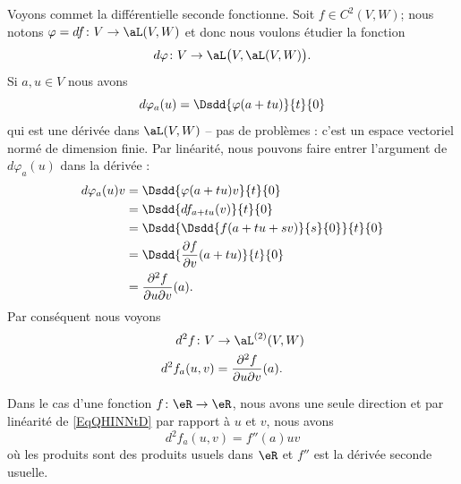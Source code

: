 \begin{example} \label{ExZHZYcNH}
    Voyons commet la différentielle seconde fonctionne. Soit \( f\in C^2(V,W)\); nous notons \( \varphi=df\colon V\to \aL(V,W)\) et donc nous voulons étudier la fonction
    \begin{equation}
        d\varphi\colon V\to \aL\big( V,\aL(V,W) \big).
    \end{equation}
    Si \( a,u\in V\)  nous avons
    \begin{equation}
        d\varphi_a(u)=\Dsdd{ \varphi(a+tu) }{t}{0}
    \end{equation}
    qui est une dérivée dans \( \aL(V,W)\) -- pas de problèmes : c'est un espace vectoriel normé de dimension finie. Par linéarité, nous pouvons faire entrer l'argument de \( d\varphi_a(u)\) dans la dérivée :
    \begin{subequations}
        \begin{align}
            d\varphi_a(u)v&=\Dsdd{ \varphi(a+tu)v }{t}{0}\\
            &=\Dsdd{ df_{a+tu}(v) }{t}{0}\\
            &=\Dsdd{  \Dsdd{ f(a+tu+sv) }{s}{0}  }{t}{0}\\
            &=\Dsdd{ \frac{ \partial f }{ \partial v }(a+tu) }{t}{0}\\
            &=\frac{ \partial^2f  }{ \partial u\partial v }(a).
        \end{align}
    \end{subequations}
    Par conséquent nous voyons
    \begin{equation}\label{EqQHINNtD}
        \begin{aligned}
            d^2f\colon V&\to \aL^{(2)}(V,W) \\
            d^2f_a(u,v)&=\frac{ \partial^2f  }{ \partial u\partial v }(a). 
        \end{aligned}
    \end{equation}
    
    Dans le cas d'une fonction \( f\colon \eR\to \eR\), nous avons une seule direction et par linéarité de \eqref{EqQHINNtD} par rapport à \( u\) et \( v\), nous avons
    \begin{equation}
        d^2f_a(u,v)=f''(a)uv
    \end{equation}
    où les produits sont des produits usuels dans \( \eR\) et \( f''\) est la dérivée seconde usuelle.
\end{example}


